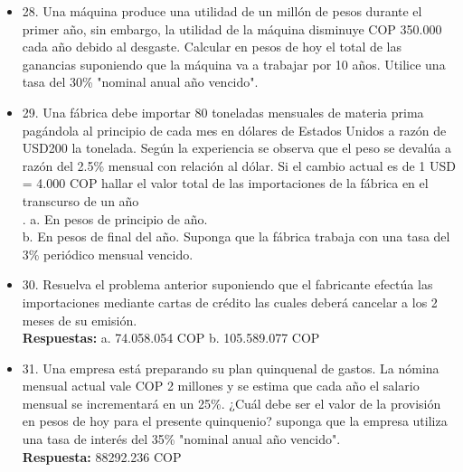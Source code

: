 \begin{itemize}
 \item 28. Una máquina produce una utilidad de un millón de pesos durante el primer año, sin embargo, la utilidad de la máquina disminuye COP 350.000 cada año debido al desgaste. Calcular en pesos de hoy el total de las ganancias suponiendo que la máquina va a trabajar por 10 años. Utilice una tasa del 30\% "nominal anual año vencido".\\
       \medskip

 \item 29. Una fábrica debe importar 80 toneladas mensuales de materia prima pagándola al principio de cada mes en dólares de Estados Unidos a razón de USD200 la tonelada. Según la experiencia se observa que el peso se devalúa a razón del 2.5\% mensual con relación al dólar. Si el cambio actual es de 1 USD =  4.000 COP hallar el valor total de las importaciones de la fábrica en el transcurso de un año\\.
       a. En pesos de principio de año.\\
       b. En pesos de final del año. Suponga que la fábrica trabaja con una tasa del 3\% periódico  mensual vencido.\\
       \medskip

 \item 30. Resuelva el problema anterior suponiendo que el fabricante efectúa las importaciones mediante cartas de crédito las cuales deberá cancelar a los 2 meses de su emisión.\\
       \textbf{Respuestas:} a. 74.058.054 COP \hspace{1,0cm}  b. 105.589.077 COP\\
       \medskip

 \item 31. Una empresa está preparando su plan quinquenal de gastos. La nómina mensual actual vale COP 2 millones y se estima que cada año el salario mensual se incrementará en un 25\%. ¿Cuál debe ser el valor de la provisión en pesos de hoy para el presente quinquenio? suponga que la empresa utiliza una tasa de interés del 35\% "nominal anual año vencido".\\
       \textbf{Respuesta:} 88292.236 COP\\
       \medskip


\end{itemize}
